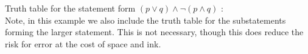 \guard







\begin{exmp}
Truth table for the statement form $(p\vee q ) \wedge \neg( p \wedge q )$ : \\
Note, in this example we also include the truth table for the substatements forming the larger statement.
This is not necessary, though this does reduce the risk for error at the cost of space and ink.
  \begin{center}
    
  \end{center}
\end{exmp}
